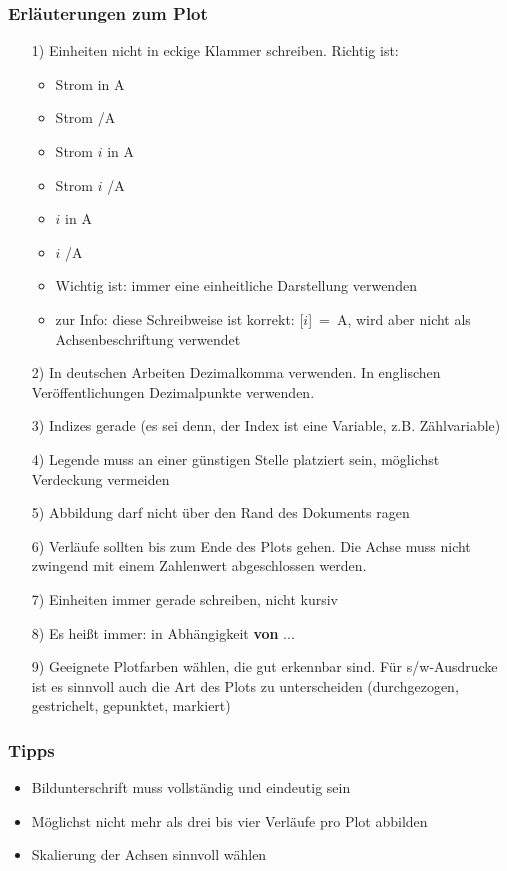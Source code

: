 \subsubsection{Erläuterungen zum Plot}

\begin{enumerate}
	\item[1)] Einheiten nicht in eckige Klammer schreiben. Richtig ist:
	\begin{itemize}
		\item Strom in A
		\item Strom /A
		\item Strom $i$ in A
		\item Strom $i$ /A
		\item $i$ in A
		\item $i$ /A
		\item Wichtig ist: immer eine einheitliche Darstellung verwenden
		\item zur Info: diese Schreibweise ist korrekt: [$i$]~=~A, wird aber nicht als Achsenbeschriftung verwendet
	\end{itemize}
	\item[2)] In deutschen Arbeiten Dezimalkomma verwenden. In englischen Veröffentlichungen Dezimalpunkte verwenden.
	\item[3)] Indizes gerade (es sei denn, der Index ist eine Variable, z.B. Zählvariable)
	\item[4)] Legende muss an einer günstigen Stelle platziert sein, möglichst Verdeckung vermeiden
	\item[5)] Abbildung darf nicht über den Rand des Dokuments ragen
	\item[6)] Verläufe sollten bis zum Ende des Plots gehen. Die Achse muss nicht zwingend mit einem Zahlenwert abgeschlossen werden.
	\item[7)] Einheiten immer gerade schreiben, nicht kursiv
	\item[8)] Es heißt immer: in Abhängigkeit \textbf{von} ...
	\item[9)] Geeignete Plotfarben wählen, die gut erkennbar sind. Für s/w-Ausdrucke ist es sinnvoll auch die Art des Plots zu unterscheiden (durchgezogen, gestrichelt, gepunktet, markiert)
\end{enumerate}

\subsubsection{Tipps}

\begin{itemize}
	\item Bildunterschrift muss vollständig und eindeutig sein
	\item Möglichst nicht mehr als drei bis vier Verläufe pro Plot abbilden
	\item Skalierung der Achsen sinnvoll wählen
\end{itemize}

